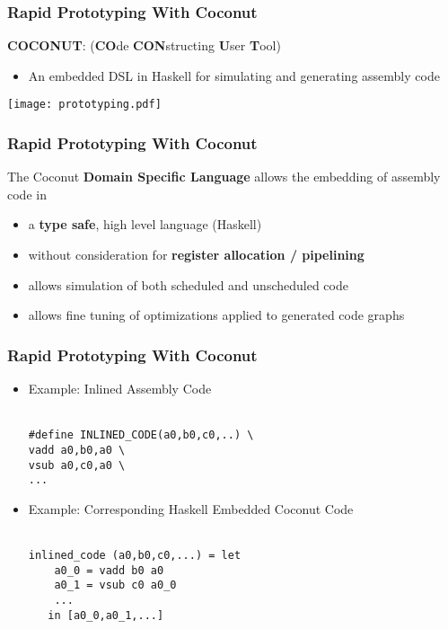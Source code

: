 \documentclass{beamer}
\begin{document}
\begin{frame}
    \frametitle{Rapid Prototyping With Coconut}

	{\bf COCONUT}: ({\bf CO}de {\bf CON}structing {\bf U}ser {\bf T}ool) \\
	\begin{itemize}
	    \item An embedded DSL in Haskell for simulating and generating assembly code
	\end{itemize}

    \texttt{[image: prototyping.pdf]}
\end{frame}      

\begin{frame}[fragile]
    \frametitle{Rapid Prototyping With Coconut}
    
    The Coconut {\bf Domain Specific Language} allows the embedding of assembly code in 
    \qquad \\
        \begin{itemize}
            \item a {\bf type safe}, high level language (Haskell)
            \item without consideration for {\bf register allocation / pipelining}
            \item allows simulation of both scheduled and unscheduled code
            \item allows fine tuning of optimizations applied to generated code graphs
        \end{itemize}    
\end{frame}

\begin{frame}[fragile]
    \frametitle{Rapid Prototyping With Coconut}

\begin{itemize}
    \item {\color{blue} Example:} Inlined Assembly Code \\
    \qquad \\
\begin{verbatim}
#define INLINED_CODE(a0,b0,c0,..) \ 
vadd a0,b0,a0 \   
vsub a0,c0,a0 \  
...          
\end{verbatim}

    \item {\color{blue} Example:} Corresponding Haskell Embedded Coconut Code \\
    \qquad \\
\begin{verbatim}                                 
inlined_code (a0,b0,c0,...) = let
    a0_0 = vadd b0 a0
    a0_1 = vsub c0 a0_0
    ...
   in [a0_0,a0_1,...]                          
\end{verbatim}
\end{itemize}
\end{frame}
\end{document}
